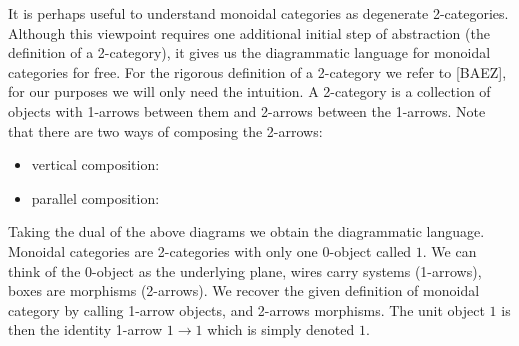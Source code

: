 \documentclass{article}
\newenvironment{remark}[1][Remark]{\begin{trivlist}
\item[\hskip \labelsep {\bfseries #1}]}{\end{trivlist}}
\begin{document}
\begin{remark}
	It is perhaps useful to understand monoidal categories as degenerate 2-categories. Although this viewpoint requires one additional initial step of abstraction (the definition of a 2-category), it gives us the diagrammatic language for monoidal categories for free. For the rigorous definition of a 2-category we refer to [BAEZ], for our purposes we will only need the intuition. A 2-category is a collection of objects with 1-arrows between them and 2-arrows between the 1-arrows. Note that there are two ways of composing the 2-arrows:
	\begin{itemize}
		\item vertical composition:
		\begin{center}
		\end{center}
		\item parallel composition:
		\begin{center}
		\end{center}
	\end{itemize}
	Taking the dual of the above diagrams we obtain the diagrammatic language. Monoidal categories are 2-categories with only one 0-object called $1$. We can think of the 0-object as the underlying plane, wires carry systems (1-arrows), boxes are morphisms (2-arrows). We recover the given definition of monoidal category by calling 1-arrow objects, and 2-arrows morphisms. The unit object $1$ is then the identity 1-arrow $1 \rightarrow 1$ which is simply denoted $1$.
\end{remark}
 
\end{document}
